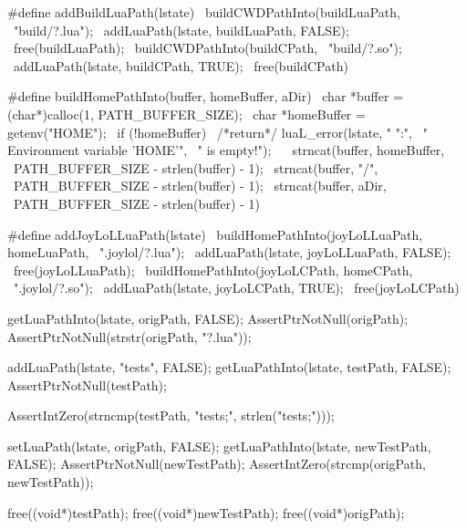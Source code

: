 #define addBuildLuaPath(lstate)            \
  buildCWDPathInto(buildLuaPath,           \
    "build/?.lua");                        \
  addLuaPath(lstate, buildLuaPath, FALSE); \
  free(buildLuaPath);                      \
  buildCWDPathInto(buildCPath,             \
    "build/?.so");                         \
  addLuaPath(lstate, buildCPath, TRUE);    \
  free(buildCPath)
  
#define buildHomePathInto(buffer, homeBuffer, aDir)     \
  char *buffer = (char*)calloc(1, PATH_BUFFER_SIZE);    \
  char *homeBuffer = getenv("HOME");                    \
  if (!homeBuffer) {                                    \
    /*return*/ luaL_error(lstate, "%
      "\nERROR:\n",                                     \
      "  Environment variable 'HOME'\n",                \
      "  is empty!\n\n");                               \
  }                                                     \
  strncat(buffer, homeBuffer,                           \
    PATH_BUFFER_SIZE - strlen(buffer) - 1);             \
  strncat(buffer, "/",                                  \
    PATH_BUFFER_SIZE - strlen(buffer) - 1);             \
  strncat(buffer, aDir,                                 \
    PATH_BUFFER_SIZE - strlen(buffer) - 1)

#define addJoyLoLLuaPath(lstate)                 \
  buildHomePathInto(joyLoLLuaPath, homeLuaPath,  \
    ".joylol/?.lua");                            \
  addLuaPath(lstate, joyLoLLuaPath, FALSE);      \
  free(joyLoLLuaPath);                           \
  buildHomePathInto(joyLoLCPath, homeCPath,      \
    ".joylol/?.so");                             \
  addLuaPath(lstate, joyLoLCPath, TRUE);         \
  free(joyLoLCPath)
\stopCHeader


\startCTest
  getLuaPathInto(lstate, origPath, FALSE);
  AssertPtrNotNull(origPath);
  AssertPtrNotNull(strstr(origPath, "?.lua"));

  addLuaPath(lstate, "tests", FALSE);
  getLuaPathInto(lstate, testPath, FALSE);
  AssertPtrNotNull(testPath);

  AssertIntZero(strncmp(testPath, "tests;", strlen("tests;")));
  
  setLuaPath(lstate, origPath, FALSE);
  getLuaPathInto(lstate, newTestPath, FALSE);
  AssertPtrNotNull(newTestPath);
  AssertIntZero(strcmp(origPath, newTestPath));

  free((void*)testPath);
  free((void*)newTestPath);
  free((void*)origPath);
\stopCTest
\stopTestCase

